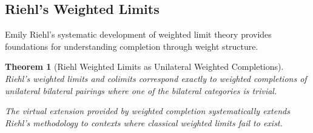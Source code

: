 \documentclass[11pt]{article}
\theoremstyle{plain}
\newtheorem{theorem}{Theorem}[section]
\theoremstyle{definition}
\theoremstyle{remark}
\begin{document}
\subsection{Riehl's Weighted Limits}

Emily Riehl's systematic development of weighted limit theory \cite{riehl2008weighted,riehl2014categorical} provides foundations for understanding completion through weight structure.

\begin{theorem}[Riehl Weighted Limits as Unilateral Weighted Completions]\label{thm:riehl-correspondence}
Riehl's weighted limits and colimits correspond exactly to weighted completions of unilateral bilateral pairings where one of the bilateral categories is trivial.

The virtual extension provided by weighted completion systematically extends Riehl's methodology to contexts where classical weighted limits fail to exist.
\end{theorem}
\end{document}
